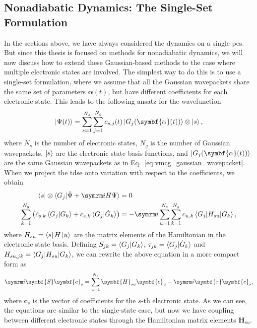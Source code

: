 \subsection{Nonadiabatic Dynamics: The Single-Set Formulation}
In the sections above, we have always considered the dynamics on a single \gls{pes}. But since this thesis is focused on methods for nonadiabatic dynamics, we will now discuss how to extend these Gaussian-based methods to the case where multiple electronic states are involved. The simplest way to do this is to use a single-set formulation, where we assume that all the Gaussian wavepackets share the same set of parameters $\symbf{\alpha}(t)$, but have different coefficients for each electronic state. This leads to the following ansatz for the wavefunction
\begin{equation}
\ket{\Psi(t)}=\sum_{s=1}^{N_s}\sum_{j=1}^{N_g} c_{s,j}(t)\ket{G_j(\symbf{\alpha}(t))}\otimes\ket{s},
\end{equation}
where $N_s$ is the number of electronic states, $N_g$ is the number of Gaussian wavepackets, $\ket{s}$ are the electronic state basis functions, and $\ket{G_j(\symbf{\alpha}(t))}$ are the same Gaussian wavepackets as in Eq.~\eqref{eq:vmcg_gaussian_wavepacket}. When we project the \gls{tdse} onto variation with respect to the coefficients, we obtain
\begin{align}
\bra{s}\otimes\braket{G_j|\dot\Psi+\i H\Psi}&=0\\
\sum_{k=1}^{N_g}\left(\dot c_{s,k}\braket{G_j|G_k}+c_{s,k}\braket{G_j|\dot G_k}\right)&=-\i\sum_{\vphantom{k}u=1}^{\vphantom{N_g}N_s}\sum_{k=1}^{N_g}c_{u,k}\braket{G_j|H_{su}|G_k},
\end{align}
where $H_{su}=\bra{s}H\ket{u}$ are the matrix elements of the Hamiltonian in the electronic state basis. Defining $S_{jk}=\braket{G_j|G_k}$, $\tau_{jk}=\braket{G_j|\dot G_k}$ and $H_{su,jk}=\braket{G_j|H_{su}|G_k}$, we can rewrite the above equation in a more compact form as
\begin{equation}
\i\symbf{S}\dot{\symbf{c}}_s=\sum_{u=1}^{N_s}\symbf{H}_{su}\symbf{c}_u-\i\symbf{\tau}\symbf{c}_s,
\end{equation}
where $\symbf{c}_s$ is the vector of coefficients for the $s$-th electronic state. As we can see, the equations are similar to the single-state case, but now we have coupling between different electronic states through the Hamiltonian matrix elements $\symbf{H}_{su}$.

